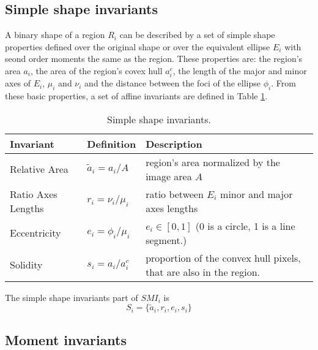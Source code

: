 \documentclass[a4paper,11pt]{article}
\begin{document}
\subsection{Simple shape invariants}
A binary shape of a region $R_i$ can be described by a set of simple shape properties defined over the original shape or over the equivalent ellipse $E_i$ with seond order moments the same as the region. These properties are: the region's area $a_i$, the area of the region's covex hull $a^c_i$, the length of the major and minor axes of $E_i$, $\mu_i$ and $\nu_i$ and the distance between the foci of the ellipse $\phi_i$.%
From these basic properties, a set of affine invariants are defined in Table \ref{tab:ssi}.   

\begin{table}[!ht]
\begin{center}
\begin{tabular}{|l||l|l|}
\hline
Invariant & Definition & Description\\
\hline
\hline
Relative Area & $\tilde{a}_i = {a_i}/{A}$ & region's area normalized by the image area $A$\\
\hline
Ratio Axes Lengths & $r_i = {\nu_i}/{\mu_i}$& ratio between $E_i$ minor and major axes lengths\\
\hline
Eccentricity &$e_i = \phi_i/\mu_i$& $e_i \in [0,1]$ (0 is a circle, 1 is a line segment.)\\
\hline
Solidity & $s_i = {a_i}/{a_i^c} $ & proportion of the convex hull pixels, that are also in the region. \\
\hline
\end{tabular}
\end{center}
\vspace{-20pt}
\caption{Simple shape invariants.} \label{tab:ssi}
  \vspace{-10pt}
\end{table}
The simple shape invariants part of $SMI_i$ is 
\begin{equation}
S_i = \{\tilde{a}_i, r_i, e_i, s_i\}
\end{equation} \label{eq:ssi}

\subsection{Moment invariants}
\end{document}

